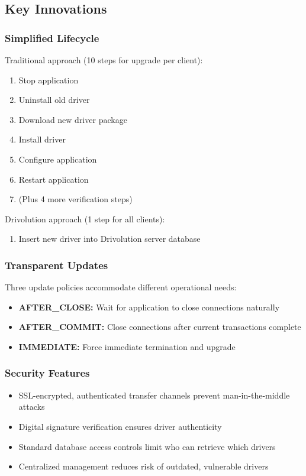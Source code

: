 \subsection{Key Innovations}

\subsubsection{Simplified Lifecycle}

Traditional approach (10 steps for upgrade per client):
\begin{enumerate}
    \item Stop application
    \item Uninstall old driver
    \item Download new driver package
    \item Install driver
    \item Configure application
    \item Restart application
    \item (Plus 4 more verification steps)
\end{enumerate}

Drivolution approach (1 step for all clients):
\begin{enumerate}
    \item Insert new driver into Drivolution server database
\end{enumerate}

\subsubsection{Transparent Updates}

Three update policies accommodate different operational needs:
\begin{itemize}
    \item \textbf{AFTER\_CLOSE:} Wait for application to close connections naturally
    \item \textbf{AFTER\_COMMIT:} Close connections after current transactions complete
    \item \textbf{IMMEDIATE:} Force immediate termination and upgrade
\end{itemize}

\subsubsection{Security Features}

\begin{itemize}
    \item SSL-encrypted, authenticated transfer channels prevent man-in-the-middle attacks
    \item Digital signature verification ensures driver authenticity
    \item Standard database access controls limit who can retrieve which drivers
    \item Centralized management reduces risk of outdated, vulnerable drivers
\end{itemize}

